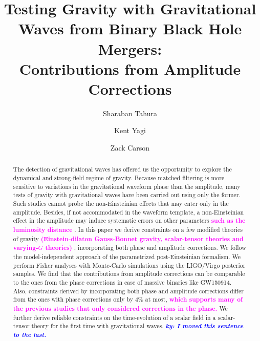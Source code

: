 \documentclass[prd,twocolumn,nofootinbib]{revtex4-1}
\newcommand{\ky}[1]{\textcolor{blue}{\it{\textbf{ky: #1}}} }
\newcommand{\kent}[1]{\textcolor{magenta}{\textbf{#1}} }
\begin{document}
\title{Testing Gravity with Gravitational Waves from Binary Black Hole Mergers: \\ Contributions from Amplitude Corrections}

\author{Sharaban Tahura}

\author{Kent Yagi}

\author{Zack Carson}

\begin{abstract}
The detection of gravitational waves has offered us the opportunity to explore the dynamical and strong-field regime of gravity.
Because matched filtering is more sensitive to variations in the gravitational waveform phase than the amplitude, many tests of gravity with gravitational waves have been carried out using only the former. Such studies cannot probe the non-Einsteinian effects that may enter only in the amplitude. Besides, if not accommodated in the waveform template, a non-Einsteinian effect in the amplitude may induce systematic errors on other parameters \kent{such as the luminosity distance}.
In this paper we derive constraints on a few modified theories of gravity \kent{(Einstein-dilaton Gauss-Bonnet gravity, scalar-tensor theories and varying-$G$ theories)}, incorporating both phase and amplitude corrections. We follow the model-independent approach of the parametrized post-Einsteinian formalism.
We perform Fisher analyses with Monte-Carlo simulations using the LIGO/Virgo posterior samples.
We find that the contributions from amplitude corrections can be comparable to the ones from the phase corrections in case of massive binaries like GW150914.
Also, constraints derived by incorporating both phase and amplitude corrections differ from the ones with phase corrections only by 4\% at most, \kent{which supports many of the previous studies that only considered corrections in the phase.} 
We further derive reliable constraints on the time-evolution of a scalar field in a scalar-tensor theory for the first time with gravitational waves.
\ky{I moved this sentence to the last.}


\end{abstract}
\end{document}
